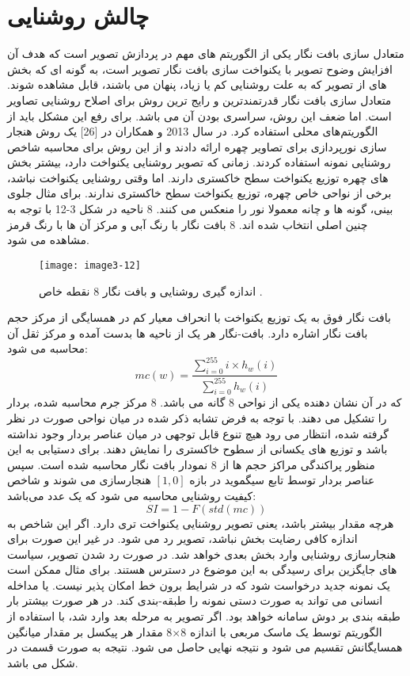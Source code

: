 \section{چالش روشنایی}
متعادل سازی بافت نگار یکی از الگوریتم های مهم در پردازش تصویر است که هدف آن افزایش وضوح تصویر با یکنواخت سازی بافت نگار تصویر است، به گونه ای که بخش های از تصویر که به علت روشنایی کم یا زیاد، پنهان می باشند، قابل مشاهده شوند. متعادل سازی بافت نگار قدرتمندترین و رایج ترین روش برای اصلاح روشنایی تصاویر است. اما ضعف این روش، سراسری بودن آن می باشد. برای رفع این مشکل باید از الگوریتم‌های محلی استفاده کرد.
\noindent
در سال 2013  و همکاران در [26] یک روش هنجار سازی نورپردازی برای تصاویر چهره ارائه دادند و از این روش برای محاسبه شاخص روشنایی نمونه  استفاده کردند. زمانی که تصویر روشنایی یکنواخت دارد، بیشتر بخش های چهره توزیع یکنواخت سطح خاکستری دارند. اما وقتی روشنایی یکنواخت نباشد، برخی از نواحی خاص چهره، توزیع یکنواخت سطح خاکستری ندارند. برای مثال جلوی بینی، گونه ها و چانه معمولا نور را منعکس می کنند. 8 ناحیه در شکل 3-12 با توجه به چنین اصلی انتخاب شده اند. 8 بافت نگار با رنگ آبی و مرکز آن ها با رنگ قرمز مشاهده می شود.
\begin{figure}[h]
\centering
  \texttt{[image: image3-12]}
  \caption{اندازه گیری روشنایی و بافت نگار 8 نقطه خاص \cite{ref1}.}
  \label{image2-1}
\end{figure}
 بافت نگار فوق به یک توزیع یکنواخت با انحراف معیار کم در همسایگی از مرکز حجم بافت نگار اشاره دارد. بافت-نگار هر یک از ناحیه ها بدست آمده و مرکز ثقل آن محاسبه می شود:
\begin{equation}\label{eq3-9}
mc\left(w\right)=\frac{\sum_{i=0}^{255}{i\times h_w(i)}}{\sum_{i=0}^{255}{h_w(i)}}		
\end{equation}
\noindent
که در آن  نشان دهنده یکی از نواحی 8 گانه می باشد. 8 مرکز جرم محاسبه شده، بردار  را تشکیل می دهند. با توجه به فرض تشابه ذکر شده در میان نواحی صورت در نظر گرفته شده، انتظار می رود هیچ تنوع قابل توجهی در میان عناصر بردار وجود نداشته باشد و توزیع های یکسانی از سطوح خاکستری را نمایش دهند. برای دستیابی به این منظور پراکندگی مراکز حجم ها از 8 نمودار بافت نگار محاسبه شده است. سپس عناصر بردار  توسط تابع سیگموید  در بازه
$[1,0]$
هنجارسازی می شوند و شاخص کیفیت روشنایی محاسبه می شود که یک عدد می‌باشد:
\begin{equation}\label{eq3-10}
SI=1-F(std\left(mc\right))	
\end{equation}
\noindent
هرچه مقدار  بیشتر باشد، یعنی تصویر روشنایی یکنواخت تری دارد. اگر این شاخص به اندازه کافی رضایت بخش نباشد، تصویر رد می شود. در غیر این صورت برای هنجارسازی روشنایی وارد بخش بعدی خواهد شد. در صورت رد شدن تصویر، سیاست های جایگزین برای رسیدگی به این موضوع در دسترس هستند. برای مثال ممکن است یک نمونه جدید درخواست شود که در شرایط برون خط امکان پذیر نیست. یا مداخله انسانی می تواند به صورت دستی نمونه را طبقه-بندی کند. در هر صورت بیشتر بار طبقه بندی بر دوش سامانه خواهد بود. اگر تصویر به مرحله بعد وارد شد، با استفاده از الگوریتم  توسط یک ماسک مربعی با اندازه 8×8 مقدار هر پیکسل بر مقدار میانگین همسایگانش تقسیم می شود و نتیجه نهایی حاصل می شود. نتیجه به صورت قسمت  در شکل  می باشد.
